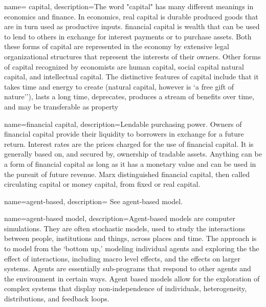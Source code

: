 {
name= capital,
description={The word "capital" has many different meanings in economics and finance.  In economics, real capital is durable produced goods that are in turn used as productive inputs. \Gls{financial capital} is wealth that can be used to lend to others in exchange for interest payments or to purchase assets. Both these forms of capital are represented in the economy by extensive legal organizational structures that represent the interests of their owners. Other forms of capital recognized by economists are human capital, social capital natural capital, and intellectual capital. The distinctive  features of capital include that it takes time and energy to create (natural capital, however is  `a free gift of nature''), lasts a long time, deprecates, produces a stream of benefits over time,  and may be transferable as property}
}

{
name=financial capital,
description={Lendable purchasing power. Owners of financial capital provide their liquidity to borrowers in exchange for a future return. Interest rates are the prices charged for the use of financial capital. It is generally based on, and  secured by, ownership of tradable assets. Anything can be a form of financial capital as long as it has a monetary value and can be used in the pursuit of future revenue. Marx distinguished financial capital, then called circulating capital or money capital, from fixed or real capital.}
}

{
name=agent-based,
description={%
See \gls{agent-based model}.}
}

{
name=agent-based model,
description={Agent-based models are computer simulations. They are often stochastic
models, used to study the interactions between people, institutions and things, across places and time. The approach is to model from the `bottom up,' modeling individual agents and exploring the the effect of interactions, including macro level effects, and the effects on larger systems. %
Agents are essentially sub-programs that respond to other agents and the environment in certain ways. %
Agent based models allow for the exploration of \glspl{complex system} that display non-independence of individuals, heterogeneity, distributions,  and \gls{feedback} loops. %
}
}

